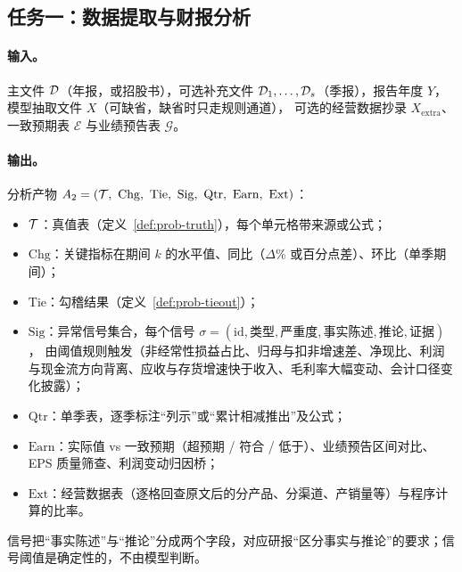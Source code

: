 \subsection{任务一：数据提取与财报分析}
\label{sec:prob-task2}

\paragraph{输入。}
主文件 $\mathcal{D}$（年报，或招股书），可选补充文件 $\mathcal{D}_1,\dots,\mathcal{D}_s$（季报），报告年度 $Y$，模型抽取文件 $X$（可缺省，缺省时只走规则通道），
可选的经营数据抄录 $X_{\text{extra}}$、一致预期表 $\mathcal{E}$ 与业绩预告表 $\mathcal{G}$。

\paragraph{输出。}
分析产物 $A_2=(\Truth,\ \mathrm{Chg},\ \mathrm{Tie},\ \mathrm{Sig},\ \mathrm{Qtr},\ \mathrm{Earn},\ \mathrm{Ext})$：
\begin{itemize}
\item $\mathcal{T}$：真值表（定义~\ref{def:prob-truth}），每个单元格带来源或公式；
\item $\mathrm{Chg}$：关键指标在期间 $k$ 的水平值、同比（$\Delta\%$ 或百分点差）、环比（单季期间）；
\item $\mathrm{Tie}$：勾稽结果（定义~\ref{def:prob-tieout}）；
\item $\mathrm{Sig}$：异常信号集合，每个信号 $\sigma=(\text{id},\text{类型},\text{严重度},\text{事实陈述},\text{推论},\text{证据})$，
      由阈值规则触发（非经常性损益占比、归母与扣非增速差、净现比、利润与现金流方向背离、应收与存货增速快于收入、毛利率大幅变动、会计口径变化披露）；
\item $\mathrm{Qtr}$：单季表，逐季标注“列示”或“累计相减推出”及公式；
\item $\mathrm{Earn}$：实际值 vs 一致预期（超预期 / 符合 / 低于）、业绩预告区间对比、EPS 质量筛查、利润变动归因桥；
\item $\mathrm{Ext}$：经营数据表（逐格回查原文后的分产品、分渠道、产销量等）与程序计算的比率。
\end{itemize}
信号把“事实陈述”与“推论”分成两个字段，对应研报“区分事实与推论”的要求；信号阈值是确定性的，不由模型判断。

